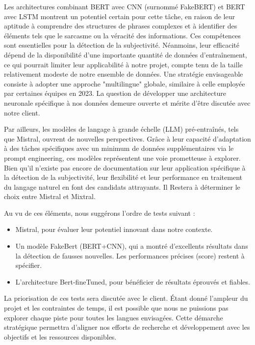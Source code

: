 \documentclass[11pt]{rapport_class}
\begin{document}
Les architectures combinant BERT avec CNN (surnommé FakeBERT) et BERT avec LSTM montrent un potentiel certain pour cette tâche, en raison de leur aptitude à comprendre des structures de phrases complexes et à identifier des éléments tels que le sarcasme ou la véracité des informations. Ces compétences sont essentielles pour la détection de la subjectivité. Néanmoins, leur efficacité dépend de la disponibilité d'une importante quantité de données d'entraînement, ce qui pourrait limiter leur applicabilité à notre projet, compte tenu de la taille relativement modeste de notre ensemble de données. Une stratégie envisageable consiste à adopter une approche "multilingue" globale, similaire à celle employée par certaines équipes en 2023. La question de développer une architecture neuronale spécifique à nos données demeure ouverte et mérite d'être discutée avec notre client.

Par ailleurs, les modèles de langage à grande échelle (LLM) pré-entraînés, tels que Mistral, ouvrent de nouvelles perspectives. Grâce à leur capacité d'adaptation à des tâches spécifiques avec un minimum de données supplémentaires via le prompt engineering, ces modèles représentent une voie prometteuse à explorer. Bien qu'il n'existe pas encore de documentation sur leur application spécifique à la détection de la subjectivité, leur flexibilité et leur performance en traitement du langage naturel en font des candidats attrayants. Il Restera à déterminer le choix entre Mistral et Mixtral.

Au vu de ces éléments, nous suggérons l'ordre de tests suivant :
\begin{itemize}
    \item  Mistral, pour évaluer leur potentiel innovant dans notre contexte.
    \item  Un modèle FakeBert (BERT+CNN), qui a montré d'excellents résultats dans la détection de fausses nouvelles. Les performances précises (score) restent à spécifier.
    \item L'architecture Bert-fineTuned, pour bénéficier de résultats éprouvés et fiables.
\end{itemize}

La priorisation de ces tests sera discutée avec le client. Étant donné l'ampleur du projet et les contraintes de temps, il est possible que nous ne puissions pas explorer chaque piste pour toutes les langues envisagées. Cette démarche stratégique permettra d'aligner nos efforts de recherche et développement avec les objectifs et les ressources disponibles.
\end{document}
